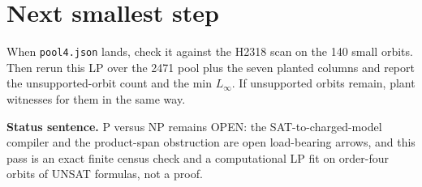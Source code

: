 \documentclass[11pt]{article}
\begin{document}
\section*{Next smallest step}
When \texttt{pool4.json} lands, check it against the H2318 scan on the 140 small orbits. Then rerun this LP over the 2471 pool plus the seven planted columns and report the unsupported-orbit count and the min $L_\infty$. If unsupported orbits remain, plant witnesses for them in the same way.

\bigskip
\noindent\textbf{Status sentence.} P versus NP remains OPEN: the SAT-to-charged-model compiler and the product-span obstruction are open load-bearing arrows, and this pass is an exact finite census check and a computational LP fit on order-four orbits of UNSAT formulas, not a proof.
\end{document}
